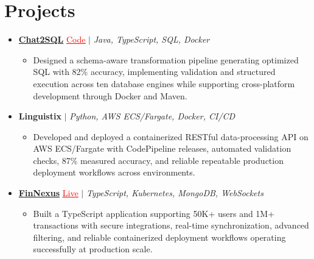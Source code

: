 \documentclass[letterpaper,10pt]{article}
\newcommand{\itemTail}{\vspace{-4pt}}
\newcommand{\projGap}{\vspace{3pt}}
\newcommand{\resumeItem}[1]{\item\small{{#1 \itemTail}}}
\newcommand{\resumeProjectHeading}[1]{\item \small #1 \vspace{-2pt}}
\newcommand{\resumeProjectLink}[2]{\href{#1}{\textcolor{red}{\underline{#2}}}}
\newcommand{\resumeSubHeadingListStart}{\begin{itemize}[leftmargin=0.0in, label={}]}
\newcommand{\resumeSubHeadingListEnd}{\end{itemize}}
\newcommand{\resumeProjItemListStart}{\begin{itemize}[leftmargin=0.15in,label=\textbullet,itemsep=3pt,topsep=0pt,parsep=0pt,partopsep=0pt]}
\newcommand{\resumeProjItemListEnd}{\end{itemize}\vspace{-4pt}}
\begin{document}
\section{Projects}
\resumeSubHeadingListStart
\vspace{-2pt}
\resumeProjectHeading{\href{https://github.com/SAHAJ-BHADJA/Chat2SQL}{\textbf{Chat2SQL}} \resumeProjectLink{https://github.com/SAHAJ-BHADJA/Chat2SQL}{Code} $|$ \emph{Java, TypeScript, SQL, Docker}}
\resumeProjItemListStart
\resumeItem{Designed a schema-aware transformation pipeline generating optimized SQL with 82\% accuracy, implementing validation and structured execution across ten database engines while supporting cross-platform development through Docker and Maven.}
\resumeProjItemListEnd
\projGap
\resumeProjectHeading{\textbf{Linguistix} $|$ \emph{Python, AWS ECS/Fargate, Docker, CI/CD}}
\resumeProjItemListStart
\resumeItem{Developed and deployed a containerized RESTful data-processing API on AWS ECS/Fargate with CodePipeline releases, automated validation checks, 87\% measured accuracy, and reliable repeatable production deployment workflows across environments.}
\resumeProjItemListEnd
\projGap
\resumeProjectHeading{\href{https://fin-nexus.vercel.app/}{\textbf{FinNexus}} \resumeProjectLink{https://fin-nexus.vercel.app/}{Live} $|$ \emph{TypeScript, Kubernetes, MongoDB, WebSockets}}
\resumeProjItemListStart
\resumeItem{Built a TypeScript application supporting 50K+ users and 1M+ transactions with secure integrations, real-time synchronization, advanced filtering, and reliable containerized deployment workflows operating successfully at production scale.}
\resumeProjItemListEnd
\resumeSubHeadingListEnd
\end{document}
